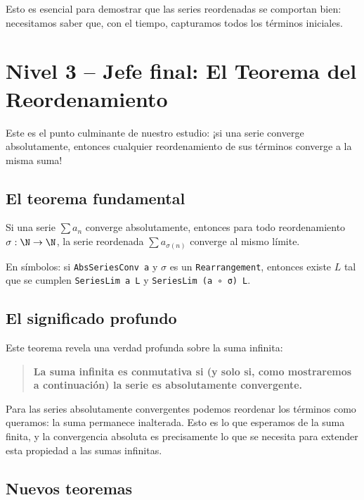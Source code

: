 Esto es esencial para demostrar que las series reordenadas se comportan bien: necesitamos saber que, con el tiempo, capturamos todos los términos iniciales.

\section{Nivel 3 -- Jefe final: El Teorema del Reordenamiento}

Este es el punto culminante de nuestro estudio: ¡si una serie converge absolutamente, entonces cualquier reordenamiento de sus términos converge a la misma suma!

\subsection{El teorema fundamental}

\begin{teorema}[RearrangementThm]
Si una serie $\sum a_n$ converge absolutamente, entonces para todo reordenamiento $\sigma : \N \to \N$, la serie reordenada $\sum a_{\sigma(n)}$ converge al mismo límite.
\end{teorema}

En símbolos: si \texttt{AbsSeriesConv a} y $\sigma$ es un \texttt{Rearrangement}, entonces existe $L$ tal que se cumplen \texttt{SeriesLim a L} y \texttt{SeriesLim (a ∘ σ) L}.

\subsection{El significado profundo}

Este teorema revela una verdad profunda sobre la suma infinita:

\begin{quote}
\textbf{La suma infinita es conmutativa si (y solo si, como mostraremos a continuación) la serie es absolutamente convergente.}
\end{quote}

Para las series absolutamente convergentes podemos reordenar los términos como queramos: la suma permanece inalterada. Esto es lo que esperamos de la suma finita, y la convergencia absoluta es precisamente lo que se necesita para extender esta propiedad a las sumas infinitas.

\subsection{Nuevos teoremas}

